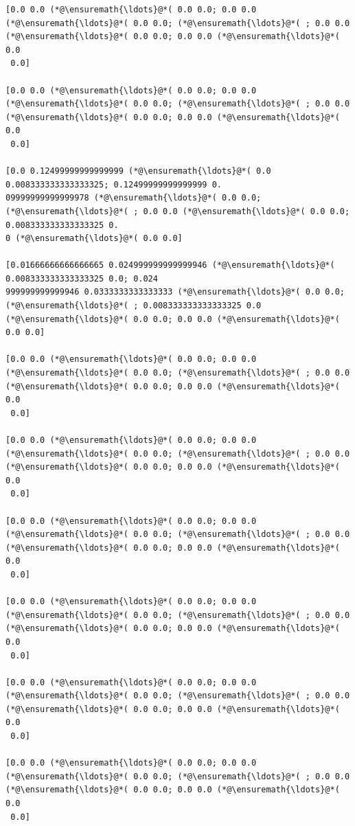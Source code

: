 \documentclass[12pt,a4paper]{article}
\begin{document}
\begin{lstlisting}
[0.0 0.0 (*@\ensuremath{\ldots}@*( 0.0 0.0; 0.0 0.0 (*@\ensuremath{\ldots}@*( 0.0 0.0; (*@\ensuremath{\ldots}@*( ; 0.0 0.0 (*@\ensuremath{\ldots}@*( 0.0 0.0; 0.0 0.0 (*@\ensuremath{\ldots}@*( 0.0
 0.0]

[0.0 0.0 (*@\ensuremath{\ldots}@*( 0.0 0.0; 0.0 0.0 (*@\ensuremath{\ldots}@*( 0.0 0.0; (*@\ensuremath{\ldots}@*( ; 0.0 0.0 (*@\ensuremath{\ldots}@*( 0.0 0.0; 0.0 0.0 (*@\ensuremath{\ldots}@*( 0.0
 0.0]

[0.0 0.12499999999999999 (*@\ensuremath{\ldots}@*( 0.0 0.008333333333333325; 0.12499999999999999 0.
09999999999999978 (*@\ensuremath{\ldots}@*( 0.0 0.0; (*@\ensuremath{\ldots}@*( ; 0.0 0.0 (*@\ensuremath{\ldots}@*( 0.0 0.0; 0.008333333333333325 0.
0 (*@\ensuremath{\ldots}@*( 0.0 0.0]

[0.01666666666666665 0.024999999999999946 (*@\ensuremath{\ldots}@*( 0.008333333333333325 0.0; 0.024
999999999999946 0.0333333333333333 (*@\ensuremath{\ldots}@*( 0.0 0.0; (*@\ensuremath{\ldots}@*( ; 0.008333333333333325 0.0 
(*@\ensuremath{\ldots}@*( 0.0 0.0; 0.0 0.0 (*@\ensuremath{\ldots}@*( 0.0 0.0]

[0.0 0.0 (*@\ensuremath{\ldots}@*( 0.0 0.0; 0.0 0.0 (*@\ensuremath{\ldots}@*( 0.0 0.0; (*@\ensuremath{\ldots}@*( ; 0.0 0.0 (*@\ensuremath{\ldots}@*( 0.0 0.0; 0.0 0.0 (*@\ensuremath{\ldots}@*( 0.0
 0.0]

[0.0 0.0 (*@\ensuremath{\ldots}@*( 0.0 0.0; 0.0 0.0 (*@\ensuremath{\ldots}@*( 0.0 0.0; (*@\ensuremath{\ldots}@*( ; 0.0 0.0 (*@\ensuremath{\ldots}@*( 0.0 0.0; 0.0 0.0 (*@\ensuremath{\ldots}@*( 0.0
 0.0]

[0.0 0.0 (*@\ensuremath{\ldots}@*( 0.0 0.0; 0.0 0.0 (*@\ensuremath{\ldots}@*( 0.0 0.0; (*@\ensuremath{\ldots}@*( ; 0.0 0.0 (*@\ensuremath{\ldots}@*( 0.0 0.0; 0.0 0.0 (*@\ensuremath{\ldots}@*( 0.0
 0.0]

[0.0 0.0 (*@\ensuremath{\ldots}@*( 0.0 0.0; 0.0 0.0 (*@\ensuremath{\ldots}@*( 0.0 0.0; (*@\ensuremath{\ldots}@*( ; 0.0 0.0 (*@\ensuremath{\ldots}@*( 0.0 0.0; 0.0 0.0 (*@\ensuremath{\ldots}@*( 0.0
 0.0]

[0.0 0.0 (*@\ensuremath{\ldots}@*( 0.0 0.0; 0.0 0.0 (*@\ensuremath{\ldots}@*( 0.0 0.0; (*@\ensuremath{\ldots}@*( ; 0.0 0.0 (*@\ensuremath{\ldots}@*( 0.0 0.0; 0.0 0.0 (*@\ensuremath{\ldots}@*( 0.0
 0.0]

[0.0 0.0 (*@\ensuremath{\ldots}@*( 0.0 0.0; 0.0 0.0 (*@\ensuremath{\ldots}@*( 0.0 0.0; (*@\ensuremath{\ldots}@*( ; 0.0 0.0 (*@\ensuremath{\ldots}@*( 0.0 0.0; 0.0 0.0 (*@\ensuremath{\ldots}@*( 0.0
 0.0]


\end{lstlisting}
\end{document}
